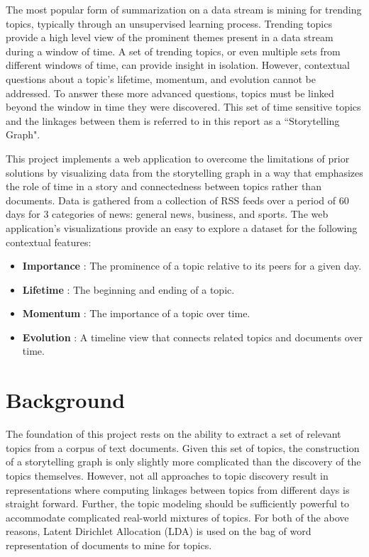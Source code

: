 \documentclass[10pt]{article}
\begin{document}
The most popular form of summarization on a data stream is mining for trending topics, typically through an unsupervised learning process. Trending topics provide a high level view of the prominent themes present in a data stream during a window of time.  A set of trending topics, or even multiple sets from different windows of time, can provide insight in isolation.   However, contextual questions about a topic's lifetime, momentum, and evolution cannot be addressed.  To answer these more advanced questions, topics must be linked beyond the window in time they were discovered.  This set of time sensitive topics and the linkages between them is referred to in this report as a ``Storytelling Graph".  

This project implements a web application to overcome the limitations of prior solutions by visualizing data from the storytelling graph in a way that emphasizes the role of time in a story and connectedness between topics rather than documents. Data is gathered from a collection of RSS feeds over a period of 60 days for 3 categories of news:  general news, business, and sports. The web application's visualizations provide an easy to explore a dataset for the following contextual features:

\begin{itemize}
\item \textbf{Importance} : The prominence of a topic relative to its peers for a given day.
\item \textbf{Lifetime} : The beginning and ending of a topic.
\item \textbf{Momentum} : The importance of a topic over time.
\item \textbf{Evolution} : A timeline view that connects related topics and documents over time. 
\end{itemize}

\section {Background}

The foundation of this project rests on the ability to extract a set of relevant topics from a corpus of text documents. Given this set of topics, the construction of a storytelling graph is only slightly more complicated than the discovery of the topics themselves.  However, not all approaches to topic discovery result in representations where computing linkages between topics from different days is straight forward.  Further, the topic modeling should be sufficiently powerful to accommodate complicated real-world mixtures of topics.  For both of the above reasons, Latent Dirichlet Allocation (LDA) is used on the bag of word representation of documents to mine for topics. 
\end{document}
